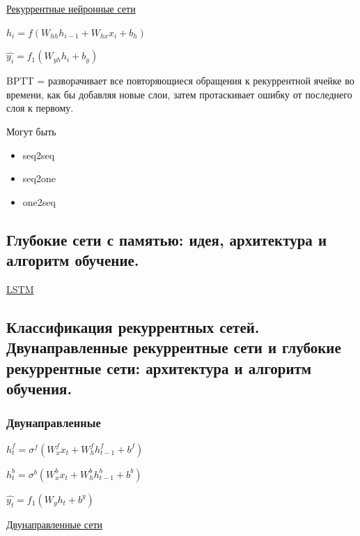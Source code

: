 \documentclass{article}
\begin{document}
\href{https://neerc.ifmo.ru/wiki/index.php?title=%D0%A0%D0%B5%D0%BA%D1%83%D1%80%D1%80%D0%B5%D0%BD%D1%82%D0%BD%D1%8B%D0%B5_%D0%BD%D0%B5%D0%B9%D1%80%D0%BE%D0%BD%D0%BD%D1%8B%D0%B5_%D1%81%D0%B5%D1%82%D0%B8}{Рекуррентные нейронные сети}

$h_i = f(W_{hh} h_{i-1} + W_{hx}x_i + b_h)$

$\hat{y_i} = f_1(W_{yh} h_i + b_y)$

BPTT = разворачивает все повторяющиеся обращения к рекуррентной ячейке
во времени, как бы добавляя новые слои, затем протаскивает ошибку от
последнего слоя к первому.

Могут быть
\begin{itemize}
	\item seq2seq
	\item seq2one
	\item one2seq
\end{itemize}


\subsection{Глубокие сети с памятью: идея, архитектура и алгоритм обучение.}

\href{
	https://neerc.ifmo.ru/wiki/index.php?title=%
}{LSTM}


\subsection{Классификация рекуррентных сетей. Двунаправленные рекуррентные сети и
глубокие рекуррентные сети: архитектура и алгоритм обучения.}

\subsubsection{Двунаправленные}

$h_t^f = \sigma^f(W_x^f x_t + W_h^f h_{t-1}^f + b^f)$

$h_t^b = \sigma^b(W_x^b x_t + W_h^b h_{t-1}^b + b^b)$

$\hat{y_t} = f_1 (W_y h_t + b^y)$

\href{https://neerc.ifmo.ru/wiki/index.php?title=%D0%A0%D0%B5%D0%BA%D1%83%D1%80%D1%80%D0%B5%D0%BD%D1%82%D0%BD%D1%8B%D0%B5_%D0%BD%D0%B5%D0%B9%D1%80%D0%BE%D0%BD%D0%BD%D1%8B%D0%B5_%D1%81%D0%B5%D1%82%D0%B8#.D0.94.D0.B2.D1.83.D0.BD.D0.B0.D0.BF.D1.80.D0.B0.D0.B2.D0.BB.D0.B5.D0.BD.D0.BD.D1.8B.D0.B5_.D1.80.D0.B5.D0.BA.D1.83.D1.80.D1.80.D0.B5.D0.BD.D1.82.D0.BD.D1.8B.D0.B5_.D1.81.D0.B5.D1.82.D0.B8}{
	Двунаправленные сети
}
\end{document}
